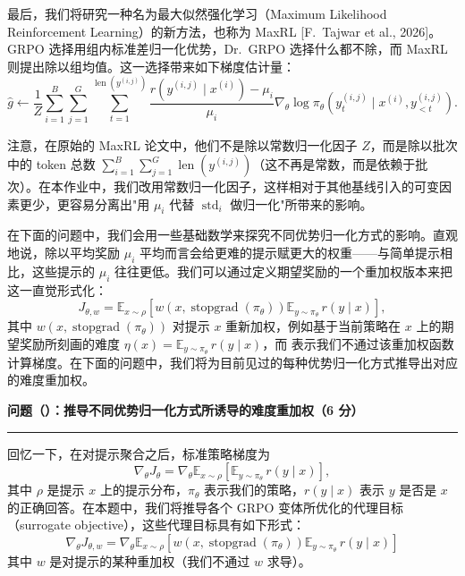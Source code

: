 最后，我们将研究一种名为最大似然强化学习（Maximum Likelihood Reinforcement Learning）的新方法，也称为 MaxRL [F.\ Tajwar et al., 2026]。GRPO 选择用组内标准差归一化优势，Dr.\ GRPO 选择什么都不除，而 MaxRL 则提出除以组均值。这一选择带来如下梯度估计量：
\begin{equation}
\hat{g} \leftarrow \frac{1}{Z}\sum_{i=1}^{B}\sum_{j=1}^{G}\sum_{t=1}^{\operatorname{len}\!\left(y^{(i,j)}\right)}
\frac{r\!\left(y^{(i,j)} \mid x^{(i)}\right) - \mu_i}{\mu_i}
\nabla_\theta \log \pi_\theta\!\left(y_t^{(i,j)} \mid x^{(i)}, y^{(i,j)}_{<t}\right).
\end{equation}

注意，在原始的 MaxRL 论文中，他们不是除以常数归一化因子 $Z$，而是除以批次中的 token 总数 $\sum_{i=1}^{B}\sum_{j=1}^{G}\operatorname{len}\!\left(y^{(i,j)}\right)$（这不再是常数，而是依赖于批次）。在本作业中，我们改用常数归一化因子，这样相对于其他基线引入的可变因素更少，更容易分离出"用 $\mu_i$ 代替 $\operatorname{std}_i$ 做归一化"所带来的影响。

在下面的问题中，我们会用一些基础数学来探究不同优势归一化方式的影响。直观地说，除以平均奖励 $\mu_i$ 平均而言会给更难的提示赋更大的权重——与简单提示相比，这些提示的 $\mu_i$ 往往更低。我们可以通过定义期望奖励的一个重加权版本来把这一直觉形式化：
\begin{equation}
J_{\theta, w} = \mathbb{E}_{x\sim\rho}\!\left[w\!\left(x, \operatorname{stopgrad}(\pi_\theta)\right)\mathbb{E}_{y\sim\pi_\theta}\, r(y \mid x)\right],
\end{equation}
其中 $w(x, \operatorname{stopgrad}(\pi_\theta))$ 对提示 $x$ 重新加权，例如基于当前策略在 $x$ 上的期望奖励所刻画的难度 $\eta(x) = \mathbb{E}_{y\sim\pi_\theta}\, r(y \mid x)$，而  表示我们不通过该重加权函数计算梯度。在下面的问题中，我们将为目前见过的每种优势归一化方式推导出对应的难度重加权。

\medskip
\noindent\textbf{问题（）：推导不同优势归一化方式所诱导的难度重加权（6 分）}
\par\nobreak\smallskip\hrule\nobreak\medskip

回忆一下，在对提示聚合之后，标准策略梯度为
\begin{equation}
\nabla_\theta J_\theta = \nabla_\theta \mathbb{E}_{x\sim\rho}\!\left[\mathbb{E}_{y\sim\pi_\theta}\, r(y \mid x)\right],
\end{equation}
其中 $\rho$ 是提示 $x$ 上的提示分布，$\pi_\theta$ 表示我们的策略，$r(y \mid x)$ 表示 $y$ 是否是 $x$ 的正确回答。在本题中，我们将推导各个 GRPO 变体所优化的代理目标（surrogate objective），这些代理目标具有如下形式：
\begin{equation}
\nabla_\theta J_{\theta,w} = \nabla_\theta \mathbb{E}_{x\sim\rho}\!\left[w\!\left(x, \operatorname{stopgrad}(\pi_\theta)\right)\mathbb{E}_{y\sim\pi_\theta}\, r(y \mid x)\right]
\end{equation}
其中 $w$ 是对提示的某种重加权（我们不通过 $w$ 求导）。

